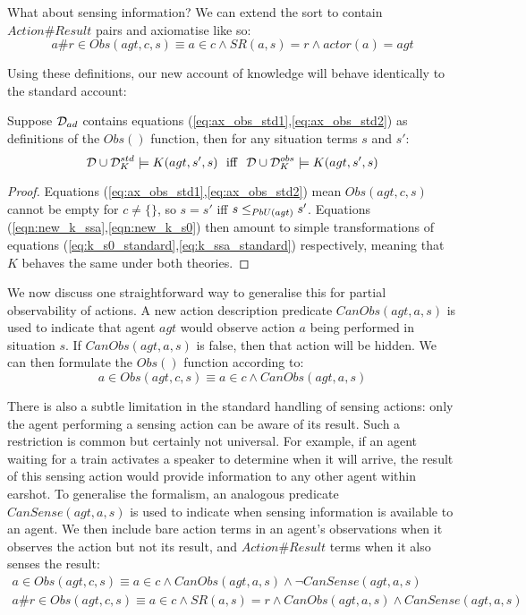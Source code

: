 What about sensing information? We can extend the 
sort to contain $Action\#Result$ pairs and axiomatise like so:\begin{equation}
a\#r\in Obs(agt,c,s)\equiv a\in c\wedge SR(a,s)=r\wedge actor(a)=agt\label{eq:ax_obs_std2}\end{equation}


Using these definitions, our new account of knowledge will behave
identically to the standard account:

\begin{thm}
Suppose $\mathcal{D}_{ad}$ contains equations (\ref{eq:ax_obs_std1},\ref{eq:ax_obs_std2})
as definitions of the $Obs()$ function, then for any situation terms
$s$ and $s'$:\[
\mathcal{D}\cup\mathcal{D}_{K}^{std}\models K(agt,s',s)\,\,\,\,\mathrm{iff}\,\,\,\,\mathcal{D}\cup\mathcal{D}_{K}^{obs}\models K(agt,s',s)\]

\end{thm}
\begin{proof}
Equations (\ref{eq:ax_obs_std1},\ref{eq:ax_obs_std2}) mean $Obs(agt,c,s)$
cannot be empty for $c\neq\{\}$, so $s=s'$ iff $s\leq_{PbU(agt)}s'$.
Equations (\ref{eqn:new_k_ssa},\ref{eqn:new_k_s0}) then amount to
simple transformations of equations (\ref{eq:k_s0_standard},\ref{eq:k_ssa_standard})
respectively, meaning that $K$ behaves the same under both theories. 
\end{proof}
We now discuss one straightforward way to generalise this for partial
observability of actions. A new action description predicate $CanObs(agt,a,s)$
is used to indicate that agent $agt$ would observe action $a$ being
performed in situation $s$. If $CanObs(agt,a,s)$ is false, then
that action will be hidden. We can then formulate the $Obs()$ function
according to:\[
a\in Obs(agt,c,s)\equiv a\in c\wedge CanObs(agt,a,s)\]


There is also a subtle limitation in the standard handling of sensing
actions: only the agent performing a sensing action can be aware of
its result. Such a restriction is common but certainly not universal.
For example, if an agent waiting for a train activates a speaker to
determine when it will arrive, the result of this sensing action would
provide information to any other agent within earshot. To generalise
the formalism, an analogous predicate $CanSense(agt,a,s)$ is used
to indicate when sensing information is available to an agent. We
then include bare action terms in an agent's observations when it
observes the action but not its result, and \emph{$Action\#Result$}
terms when it also senses the result:\begin{gather*}
a\in Obs(agt,c,s)\equiv a\in c\wedge CanObs(agt,a,s)\wedge\neg CanSense(agt,a,s)\\
a\#r\in Obs(agt,c,s)\equiv a\in c\wedge SR(a,s)=r\wedge CanObs(agt,a,s)\wedge CanSense(agt,a,s)\end{gather*}



